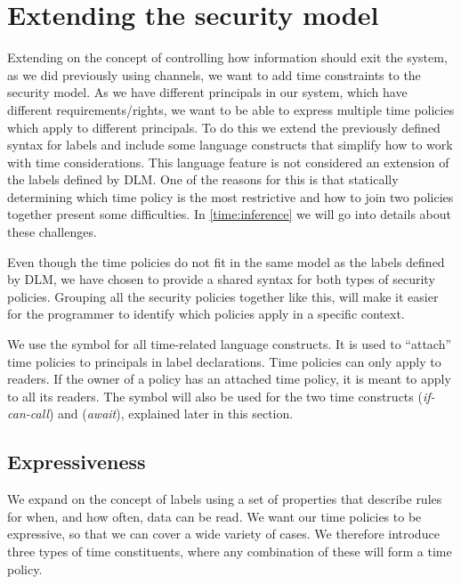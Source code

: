 
\section{Extending the security model}
Extending on the concept of controlling how information should exit the system, as we did previously using channels, we want to add time constraints to the security model.
As we have different principals in our system, which have different requirements/rights, we want to be able to express multiple time policies which apply to different principals.
To do this we extend the previously defined syntax for labels and include some language constructs that simplify how to work with time considerations.
This language feature is not considered an extension of the labels defined by DLM.
One of the reasons for this is that statically determining which time policy is the most restrictive and how to join two policies together present some difficulties.
In \cref{time:inference} we will go into details about these challenges.

Even though the time policies do not fit in the same model as the labels defined by DLM, we have chosen to provide a shared syntax for both types of security policies.
Grouping all the security policies together like this, will make it easier for the programmer to identify which policies apply in a specific context.

We use the  symbol for all time-related language constructs.
It is used to ``attach'' time policies to principals in label declarations.
Time policies can only apply to readers.
If the owner of a policy has an attached time policy, it is meant to apply to all its readers.
The  symbol will also be used for the two time constructs  (\emph{if-can-call})  and  (\emph{await}), explained later in this section.

\subsection{Expressiveness}\label{time:expressiveness}
We expand on the concept of labels using a set of properties that describe rules for when, and how often, data can be read.
We want our time policies to be expressive, so that we can cover a wide variety of cases.
We therefore introduce three types of time constituents, where any combination of these will form a time policy.

